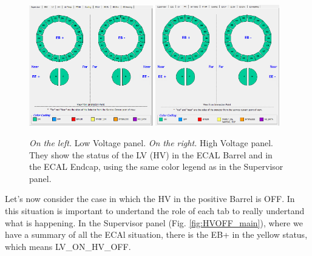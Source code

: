\documentclass[12pt]{article}
\begin{document}
\begin{figure}[!h]
	\centering
	\includegraphics[width=0.48\textwidth]{Pics/LV_panel.png}
	\quad 
		\includegraphics[width=0.48\textwidth]{Pics/HV_panel.png}
	\caption{\textit{On the left.} Low Voltage panel. \textit{On the right.} High Voltage panel.\\  They show the status of the LV (HV) in the ECAL Barrel and in the ECAL Endcap, using the same color legend as in the Supervisor panel. }
	\label{fig:LVHV}
\end{figure}

Let's now consider the case in which the HV in the positive Barrel is OFF. In this situation is important to undertand the role of each tab to really undertand what is happening. In the Supervisor panel (Fig. \ref{fig:HVOFF_main}), where we have a summary of all the ECAl situation, there is the EB+ in the yellow status, which means LV\_ON\_HV\_OFF.
\end{document}
